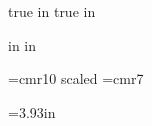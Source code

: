 %
%

\sloppy

\newif\iflong %
\longfalse
\def\piflong#1{\iflong#1
\else\fi}%

\def\xpair{{x_1,x_2}}

 true in
 true in
\nopagenumbers

\def\compressedDisplay#1{\vskip -8pt\relax$$#1$$}

 in
 in
\hsize=8in
\vsize=10.5in
\parindent=0pt

\font\bigger =cmr10 scaled
\font\smallfont=cmr7


\def\strutA#1#2{\vrule height#1 depth#2 width0pt}

=3.93in
\newbox\bigbox

